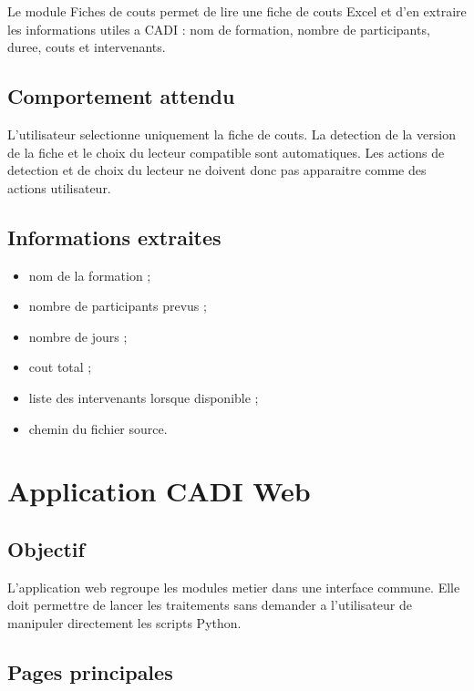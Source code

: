 \documentclass[11pt,a4paper]{report}
\begin{document}
Le module Fiches de couts permet de lire une fiche de couts Excel et d'en extraire les informations utiles a CADI : nom de formation, nombre de participants, duree, couts et intervenants.

\section{Comportement attendu}

L'utilisateur selectionne uniquement la fiche de couts. La detection de la version de la fiche et le choix du lecteur compatible sont automatiques. Les actions de detection et de choix du lecteur ne doivent donc pas apparaitre comme des actions utilisateur.

\section{Informations extraites}

\begin{itemize}
  \item nom de la formation ;
  \item nombre de participants prevus ;
  \item nombre de jours ;
  \item cout total ;
  \item liste des intervenants lorsque disponible ;
  \item chemin du fichier source.
\end{itemize}

\chapter{Application CADI Web}

\section{Objectif}

L'application web regroupe les modules metier dans une interface commune. Elle doit permettre de lancer les traitements sans demander a l'utilisateur de manipuler directement les scripts Python.

\section{Pages principales}
\end{document}
